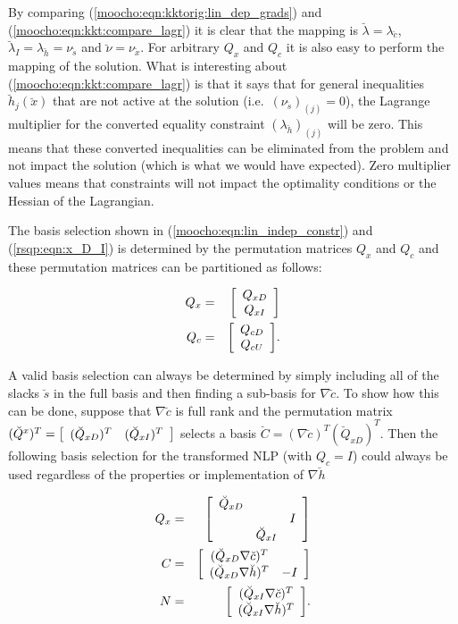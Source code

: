 \documentclass[pdf,ps2pdf,11pt]{SANDreport}
\begin{document}
{By comparing (\ref{moocho:eqn:kktorig:lin_dep_grads}) and (\ref{moocho:eqn:kkt:compare_lagr})
it is clear that the mapping is
$\breve{\lambda} = \lambda_{\breve{c}}$, $\breve{\lambda}_I = \lambda_{\breve{h}} = \nu_{\breve{s}}$
and $\breve{\nu} = \nu_{\breve{x}}$.  For arbitrary $Q_x$ and $Q_c$ it is also easy to
perform the mapping of the solution.  What is interesting about
(\ref{moocho:eqn:kkt:compare_lagr}) is that it says that for general inequalities
$\breve{h}_j(\breve{x})$ that are not active at the solution (i.e.~$(\nu_{\breve{s}})_{(j)} = 0$), the
Lagrange multiplier for the converted equality constraint $(\lambda_{\breve{h}})_{(j)}$ will be zero.
This means that these converted inequalities can be eliminated from the problem and not impact the
solution (which is what we would have expected).  Zero multiplier values means that constraints
will not impact the optimality conditions or the Hessian of the Lagrangian.

The basis selection shown in (\ref{moocho:eqn:lin_indep_constr}) and
(\ref{rsqp:eqn:x_D_I}) is determined by the permutation matrices $Q_x$ and $Q_c$
and these permutation matrices can be partitioned as follows:

\begin{eqnarray}
Q_{x} & = & {\bmat{c} Q_{xD} \\ Q_{xI} \emat} \label{moocho:eqn:Qx} \\
Q_{c} & = & {\bmat{c} Q_{cD} \\ Q_{cU} \emat} \label{moocho:eqn:Qc}.
\end{eqnarray}

A valid basis selection can always be determined by simply including all of the slacks
$\breve{s}$ in the full basis and then finding a sub-basis for $\nabla \breve{c}$.  To show
how this can be done, suppose that $\nabla \breve{c}$ is full rank and
the permutation matrix $(\breve{Q}^x)^T = {\bmat{cc} (\breve{Q}_{xD})^T
& (\breve{Q}_{xI})^T \emat}$ selects a basis
$\breve{C} = (\nabla \breve{c})^T (\breve{Q}_{xD})^T$.
Then the following basis selection for the transformed NLP (with $Q_c = I$)
could always be used
regardless of the properties or implementation of $\nabla \breve{h}$

\begin{eqnarray}
Q_x & = & {\bmat{ccc}
 \breve{Q}_{xD}  &                &     \\
                 &                & I   \\
                 & \breve{Q}_{xI} &
\emat} \\
C & = & {\bmat{cc} ( \breve{Q}_{xD} \nabla \breve{c} )^T \\ ( \breve{Q}_{xD} \nabla \breve{h} )^T & -I \emat}
	\label{moocho:eqn:C_with_slacks} \\
N & = & {\bmat{c} ( \breve{Q}_{xI} \nabla \breve{c} )^T \\ ( \breve{Q}_{xI} \nabla \breve{h} )^T \emat}.
\end{eqnarray}

}
\end{document}
